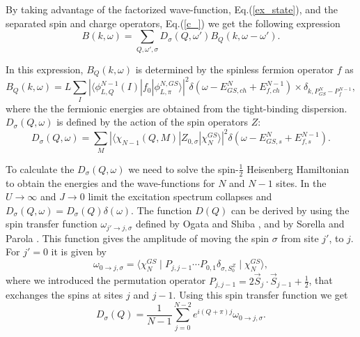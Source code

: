 \documentclass[article,11pt]{revtex4}
\begin{document}
By taking advantage of the factorized wave-function, Eq.(\ref{ex_state}), and the separated spin and charge operators, Eq.(\ref{c_}) we get the following expression
\begin{equation}
B(k,\omega)= \sum_{Q,\omega',\sigma} D_{\sigma}(Q,\omega') B_Q(k,\omega-\omega').
\label{B_conv}
\end{equation}

In this expression, $B_Q(k,\omega)$ is determined by the spinless fermion operator $f$ as 
\begin{equation}
B_Q(k,\omega)= L \sum_{I} |\langle \phi^{N-1}_{L,Q}(I) | f_0 | \phi^{N,GS}_{L,\pi}\rangle | ^2 \delta (\omega - E_{GS,ch}^N + E_{f,ch} ^{N-1}) \times \delta_{k,P_{GS}^N-P_f^{N-1}},
\label{B_Q}
\end{equation}
where the the fermionic energies are obtained from the tight-binding dispersion.
$D_{\sigma}(Q,\omega)$ is defined by the action of the spin operators $Z$: 
\begin{equation}
D_{\sigma}(Q,\omega)= \sum_{M} |\langle \chi_{N-1}(Q,M) |  {Z}_{0,\sigma} | \chi_N^{GS} \rangle | ^2 \delta (\omega - E_{GS,s}^N + E_{f,s} ^{N-1}).
\label{D_sigma_Q}
\end{equation}

To calculate the $D_{\sigma}(Q,\omega)$ we need to solve the spin-$\frac{1}{2}$ Heisenberg Hamiltonian to obtain the energies and the wave-functions for $N$ and $N-1$ sites. In the $U\rightarrow \infty$ and $J \rightarrow 0$ limit the excitation spectrum collapses and $D_{\sigma}(Q,\omega)=D_{\sigma}(Q)\delta(\omega)$. The function  $D(Q)$ can be derived by using the spin transfer function $\omega_{j' \rightarrow j,\sigma}$ defined by Ogata and Shiba \cite{Ogata1990,Ogata1991}, and by Sorella and Parola \cite{Sorella1991}. This function gives the amplitude of moving the spin $\sigma$ from site $j'$, to $j$. For $j'=0$ it is given by
\begin{equation}
        \omega_{0 \rightarrow j,\sigma} = \langle \chi_N^{GS} \mid P_{j,j-1} \dotsb  P_{0,1} \delta_{\sigma,S_0^Z} \mid \chi_N^{GS} \rangle,
\label{omega}
\end{equation}
where we introduced the permutation operator $P_{j,j-1} = 2 \vec{S}_j \cdot \vec{S}_{j-1} + \frac{1}{2}$, that exchanges the spins at sites $j$ and $j-1$. Using this spin transfer function we get
\begin{equation}
        D_{\sigma}(Q) = \frac{1}{N-1} \sum_{j=0}^{N-2} e^{i (Q+\pi)j} \omega_{0 \rightarrow j,\sigma}.
\label{D_Q}
\end{equation}
\end{document}
